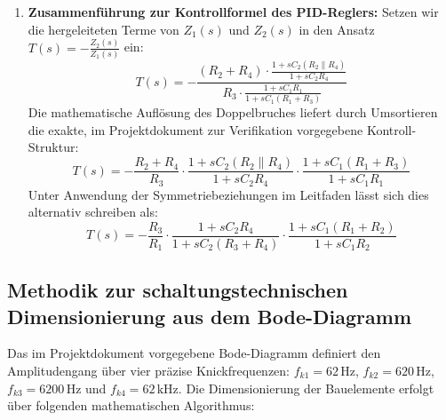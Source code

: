 \documentclass[11pt,a4paper]{article}
\begin{document}
\begin{enumerate}
    \item \textbf{Zusammenführung zur Kontrollformel des PID-Reglers:}
    Setzen wir die hergeleiteten Terme von $Z_1(s)$ und $Z_2(s)$ in den Ansatz $T(s) = -\frac{Z_2(s)}{Z_1(s)}$ ein:
    \begin{equation}
    T(s) = -\frac{(R_2 + R_4) \cdot \frac{1 + sC_2 (R_2 \parallel R_4)}{1 + sC_2 R_4}}{R_3 \cdot \frac{1 + sC_1 R_1}{1 + sC_1(R_1 + R_3)}}
    \end{equation}
    Die mathematische Auflösung des Doppelbruches liefert durch Umsortieren die exakte, im Projektdokument zur Verifikation vorgegebene Kontroll-Struktur:
    \begin{equation}
    T(s) = -\frac{R_2 + R_4}{R_3} \cdot \frac{1 + sC_2 (R_2 \parallel R_4)}{1 + sC_2 R_4} \cdot \frac{1 + sC_1(R_1 + R_3)}{1 + sC_1 R_1}
    \end{equation}
    Unter Anwendung der Symmetriebeziehungen im Leitfaden lässt sich dies alternativ schreiben als:
    \begin{equation}
    T(s) = -\frac{R_3}{R_1} \cdot \frac{1 + sC_2 R_4}{1 + sC_2(R_3 + R_4)} \cdot \frac{1 + sC_1(R_1 + R_2)}{1 + sC_1 R_2}
    \end{equation}
\end{enumerate}

\subsection{Methodik zur schaltungstechnischen Dimensionierung aus dem Bode-Diagramm}
Das im Projektdokument vorgegebene Bode-Diagramm definiert den Amplitudengang über vier präzise Knickfrequenzen: $f_{k1} = 62\,\text{Hz}$, $f_{k2} = 620\,\text{Hz}$, $f_{k3} = 6200\,\text{Hz}$ und $f_{k4} = 62\,\text{kHz}$. Die Dimensionierung der Bauelemente erfolgt über folgenden mathematischen Algorithmus:
\end{document}
